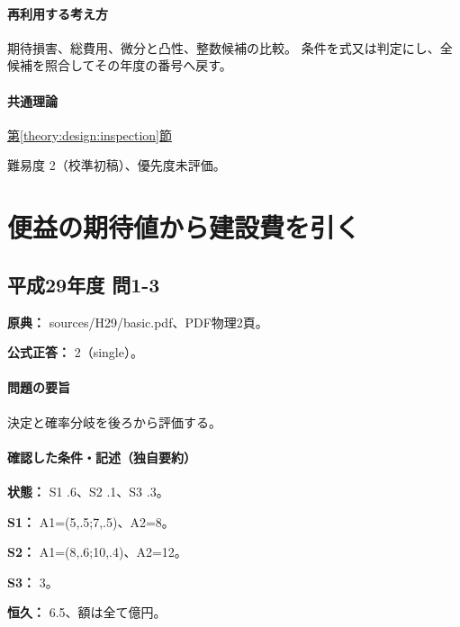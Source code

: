 \paragraph{再利用する考え方} 期待損害、総費用、微分と凸性、整数候補の比較。 条件を式又は判定にし、全候補を照合してその年度の番号へ戻す。

\paragraph{共通理論} \hyperref[theory:design:inspection]{第\ref*{theory:design:inspection}節}

\par 難易度 2（校準初稿）、優先度未評価。

\section{便益の期待値から建設費を引く}

\subsection{平成29年度 問1-3}
\label{q:h29-reg-basic-1-3}

\noindent\textbf{原典：} sources/H29/basic.pdf、PDF物理2頁。

\textbf{公式正答：} 2（single）。

\paragraph{問題の要旨} 決定と確率分岐を後ろから評価する。

\paragraph{確認した条件・記述（独自要約）}\mbox{}\par

\noindent\textbf{状態：} S1 .6、S2 .1、S3 .3。\par

\noindent\textbf{S1：} A1=\allowbreak{}(5,.5;7,.5)、A2=\allowbreak{}8。\par

\noindent\textbf{S2：} A1=\allowbreak{}(8,.6;10,.4)、A2=\allowbreak{}12。\par

\noindent\textbf{S3：} 3。\par

\noindent\textbf{恒久：} 6.5、額は全て億円。\par

